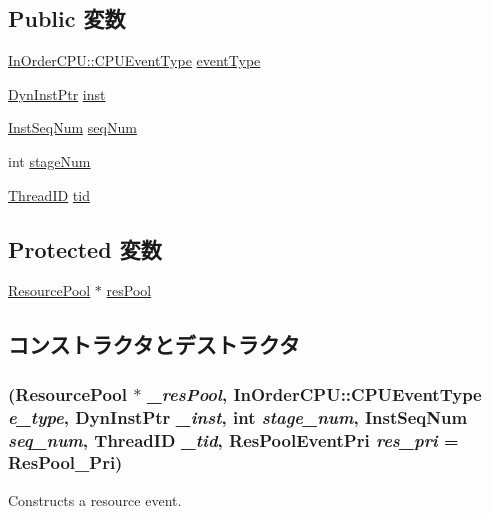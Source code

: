\subsection*{Public 変数}
\begin{DoxyCompactItemize}
\item 
\hyperlink{classInOrderCPU_aedc081b7a3ef1b1568e62dec4a64c1ca}{InOrderCPU::CPUEventType} \hyperlink{classResourcePool_1_1ResPoolEvent_abcff4f22873a99dfd8cd047686afab76}{eventType}
\item 
\hyperlink{classRefCountingPtr}{DynInstPtr} \hyperlink{classResourcePool_1_1ResPoolEvent_af5d4fb974eeb4507d4c837d365d0cefc}{inst}
\item 
\hyperlink{inst__seq_8hh_a258d93d98edaedee089435c19ea2ea2e}{InstSeqNum} \hyperlink{classResourcePool_1_1ResPoolEvent_af9da73f56d2d0e7fd5009b70c4cf3542}{seqNum}
\item 
int \hyperlink{classResourcePool_1_1ResPoolEvent_a9da7aa2f94c428eaed5adad96a6ab151}{stageNum}
\item 
\hyperlink{base_2types_8hh_ab39b1a4f9dad884694c7a74ed69e6a6b}{ThreadID} \hyperlink{classResourcePool_1_1ResPoolEvent_aa508770268ee4ceaf16054b9e0be0e17}{tid}
\end{DoxyCompactItemize}
\subsection*{Protected 変数}
\begin{DoxyCompactItemize}
\item 
\hyperlink{classResourcePool}{ResourcePool} $\ast$ \hyperlink{classResourcePool_1_1ResPoolEvent_a2979f0f9689d1d8615cacdc85c65e11f}{resPool}
\end{DoxyCompactItemize}


\subsection{コンストラクタとデストラクタ}
\hypertarget{classResourcePool_1_1ResPoolEvent_ade7f67811e3091d431bff925744abfa9}{
\subsubsection[{ResPoolEvent}]{ ({\bf ResourcePool} $\ast$ {\em \_\-resPool}, \/  {\bf InOrderCPU::CPUEventType} {\em e\_\-type}, \/  {\bf DynInstPtr} {\em \_\-inst}, \/  int {\em stage\_\-num}, \/  {\bf InstSeqNum} {\em seq\_\-num}, \/  {\bf ThreadID} {\em \_\-tid}, \/  {\bf ResPoolEventPri} {\em res\_\-pri} = {\ttfamily ResPool\_\-Pri})}}
\label{classResourcePool_1_1ResPoolEvent_ade7f67811e3091d431bff925744abfa9}
Constructs a resource event. 


